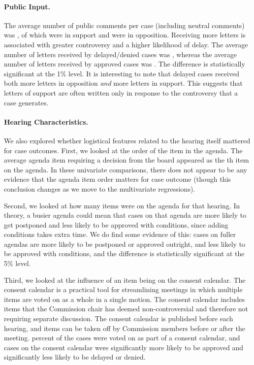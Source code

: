 \paragraph{Public Input.} The average number of public comments per case (including neutral comments) was , of which  were in support and  were in opposition. Receiving more letters is associated with greater controversy and a higher likelihood of delay. The average number of letters received by delayed/denied cases was , whereas the average number of letters received by approved cases was . The difference is statistically significant at the 1\% level. It is interesting to note that delayed cases received both more letters in opposition \emph{and} more letters in support. This suggests that letters of support are often written only in response to the controversy that a case generates.

\paragraph{Hearing Characteristics.} We also explored whether logistical features related to the hearing itself mattered for case outcomes. First, we looked at the order of the item in the agenda. The average agenda item requiring a decision from the board appeared as the th item on the agenda. In these univariate comparisons, there does not appear to be any evidence that the agenda item order matters for case outcome (though this conclusion changes as we move to the multivariate regressions). 

Second, we looked at how many items were on the agenda for that hearing. In theory, a busier agenda could mean that cases on that agenda are more likely to get postponed and less likely to be approved with conditions, since adding conditions takes extra time. We do find some evidence of this: cases on fuller agendas are more likely to be postponed or approved outright, and less likely to be approved with conditions, and the difference is statistically significant at the 5\% level. 

Third, we looked at the influence of an item being on the consent calendar. The consent calendar is a practical tool for streamlining meetings in which multiple items are voted on as a whole in a single motion. The consent calendar includes items that the Commission chair has deemed non-controversial and therefore not requiring separate discussion. The consent calendar is published before each hearing, and items can be taken off by Commission members before or after the meeting.  percent of the cases were voted on as part of a consent calendar, and cases on the consent calendar were significantly more likely to be approved and significantly less likely to be delayed or denied.

